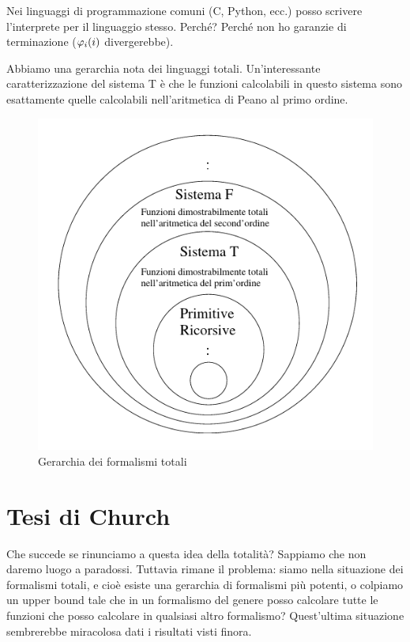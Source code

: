 Nei linguaggi di programmazione comuni (C, Python, ecc.) posso scrivere l'interprete per il
linguaggio stesso. Perché? Perché non ho garanzie di terminazione ($\varphi_{i}(i)$ divergerebbe).

Abbiamo una gerarchia nota dei linguaggi totali. Un'interessante caratterizzazione del sistema T è
che le funzioni calcolabili in questo sistema sono esattamente quelle calcolabili nell'aritmetica di
Peano al primo ordine.

\begin{figure}[h]
    \centering
    \includegraphics[scale=0.5]{img/TotalHierarchy.jpg}
    \caption{Gerarchia dei formalismi totali}
\end{figure}

\section{Tesi di Church}

Che succede se rinunciamo a questa idea della totalità? Sappiamo che non daremo luogo a paradossi.
Tuttavia rimane il problema: siamo nella situazione dei formalismi totali, e cioè esiste una
gerarchia di formalismi più potenti, o colpiamo un upper bound tale che in un formalismo del genere
posso calcolare tutte le funzioni che posso calcolare in qualsiasi altro formalismo?  Quest'ultima
situazione sembrerebbe miracolosa dati i risultati visti finora.

